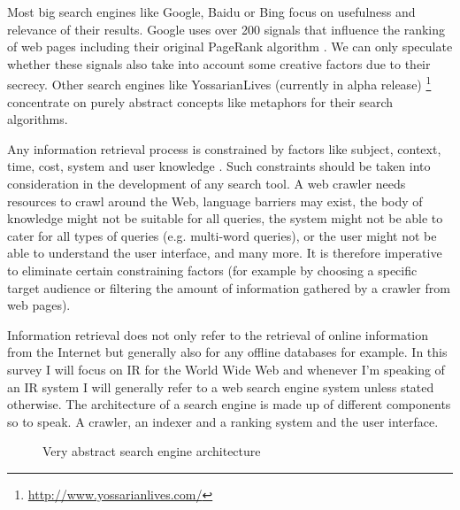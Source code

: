 Most big search engines like Google, Baidu or Bing focus on usefulness and relevance of their results.\citep{Google2012, Baidu2012, Microsoft2012a} Google uses over 200 signals \citep{Google2012} that influence the ranking of web pages including their original PageRank algorithm \citep{Brin1998, Brin1998b}. We can only speculate whether these signals also take into account some creative factors due to their secrecy. Other search engines like YossarianLives (currently in alpha release) \footnote{\url{http://www.yossarianlives.com/}} concentrate on purely abstract concepts like metaphors for their search algorithms.

Any information retrieval process is constrained by factors like subject, context, time, cost, system and user knowledge \citep{Marchionini1988}. Such constraints should be taken into consideration in the development of any search tool. A web crawler needs resources to crawl around the Web, language barriers may exist, the body of knowledge might not be suitable for all queries, the system might not be able to cater for all types of queries (e.g. multi-word queries), or the user might not be able to understand the user interface, and many more. It is therefore imperative to eliminate certain constraining factors (for example by choosing a specific target audience or filtering the amount of information gathered by a crawler from web pages).

Information retrieval does not only refer to the retrieval of online information from the Internet but generally also for any offline databases for example. In this survey I will focus on IR for the World Wide Web and whenever I'm speaking of an IR system I will generally refer to a web search engine system unless stated otherwise. The architecture of a search engine is made up of different components so to speak. A crawler, an indexer and a ranking system and the user interface.

\begin{figure}
  \centering
\caption[Search Engine Architecture]{Very abstract search engine architecture}
\label{fig:SEA}
\end{figure}

